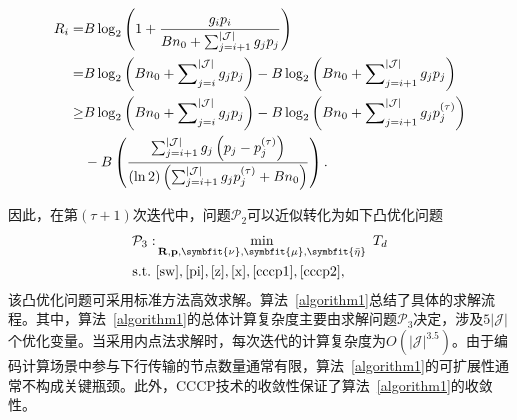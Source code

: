 	\begin{align}
	R_i=&B\log_2\left(1+\frac{g_ip_{i}}{Bn_0+\sum_{j={i+1}}^{|\mathcal{J}|}g_jp_j}\right)
	\notag\\=&B\log_2\left(Bn_0+\sum\nolimits_{j={i}}^{|\mathcal{J}|}g_jp_j\right)-B\log_2\left(Bn_0+\sum\nolimits_{j={i+1}}^{|\mathcal{J}|}g_jp_j\right)\notag\\
	\geq&
	B\log_2\left({Bn_0+\sum\nolimits_{j={i}}^{|\mathcal{J}|}g_jp_j}\right)
	-B\log_2\left({Bn_0+\sum\nolimits_{j={i+1}}^{|\mathcal{J}|}g_jp_j^{(\tau)}}\right)\notag\\&-
	B\left(\frac{\sum_{j={i+1}}^{|\mathcal{J}|}g_j\left(p_{j}-p_{j}^{(\tau)}\right)}{(\ln2)\left(\sum_{j={i+1}}^{|\mathcal{J}|}g_jp_{j}^{(\tau)}+Bn_0\right)}\right)\label{cccp2}.
\end{align}

因此，在第$(\tau+1)$次迭代中，问题$\mathcal{P}_2$可以近似转化为如下凸优化问题
\begin{align}
	\mathcal{P}_3:& \min_{\mathbf{R},\mathbf{p},\symbfit{\nu},\symbfit{\mu},\symbfit{\bar{\eta}}} ~T_{d}\\
	\text{s.t.}~ &\eqref{sw},\eqref{pi},\eqref{z},\eqref{x},\eqref{cccp1},\eqref{cccp2}\notag,
\end{align}
该凸优化问题可采用标准方法高效求解。算法~\ref{algorithm1}总结了具体的求解流程。其中，算法~\ref{algorithm1}的总体计算复杂度主要由求解问题$\mathcal{P}_3$决定，涉及$5|\mathcal{J}|$个优化变量。当采用内点法求解时，每次迭代的计算复杂度为$O(|\mathcal{J}|^{3.5})$。由于编码计算场景中参与下行传输的节点数量通常有限，算法~\ref{algorithm1}的可扩展性通常不构成关键瓶颈。此外，CCCP技术的收敛性保证了算法~\ref{algorithm1}的收敛性。

